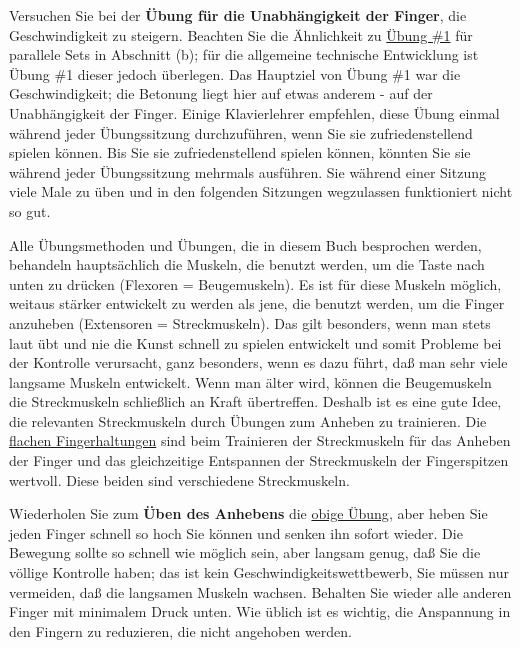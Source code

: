 Versuchen Sie bei der \textbf{Übung für die Unabhängigkeit der Finger}, die Geschwindigkeit zu steigern.
Beachten Sie die Ähnlichkeit zu \hyperref[c1iii7b1]{Übung \#1} für parallele Sets in Abschnitt (b); für die allgemeine technische Entwicklung ist Übung \#1 dieser jedoch überlegen.
Das Hauptziel von Übung \#1 war die Geschwindigkeit; die Betonung liegt hier auf etwas anderem - auf der Unabhängigkeit der Finger.
Einige Klavierlehrer empfehlen, diese Übung einmal während jeder Übungssitzung durchzuführen, wenn Sie sie zufriedenstellend spielen können.
Bis Sie sie zufriedenstellend spielen können, könnten Sie sie während jeder Übungssitzung mehrmals ausführen.
Sie während einer Sitzung viele Male zu üben und in den folgenden Sitzungen wegzulassen funktioniert nicht so gut.

Alle Übungsmethoden und Übungen, die in diesem Buch besprochen werden, behandeln hauptsächlich die Muskeln, die benutzt werden, um die Taste nach unten zu drücken (Flexoren = Beugemuskeln).
Es ist für diese Muskeln möglich, weitaus stärker entwickelt zu werden als jene, die benutzt werden, um die Finger anzuheben (Extensoren = Streckmuskeln).
Das gilt besonders, wenn man stets laut übt und nie die Kunst schnell zu spielen entwickelt und somit Probleme bei der Kontrolle verursacht, ganz besonders, wenn es dazu führt, daß man sehr viele langsame Muskeln entwickelt.
Wenn man älter wird, können die Beugemuskeln die Streckmuskeln schließlich an Kraft übertreffen.
Deshalb ist es eine gute Idee, die relevanten Streckmuskeln durch Übungen zum Anheben zu trainieren.
Die \hyperref[c1iii4b]{flachen Fingerhaltungen} sind beim Trainieren der Streckmuskeln für das Anheben der Finger und das gleichzeitige Entspannen der Streckmuskeln der Fingerspitzen wertvoll.
Diese beiden sind verschiedene Streckmuskeln.


\label{c1iii7anheben}

Wiederholen Sie zum \textbf{Üben des Anhebens} die \hyperref[c1iii7finger]{obige Übung}, aber heben Sie jeden Finger schnell so hoch Sie können und senken ihn sofort wieder.
Die Bewegung sollte so schnell wie möglich sein, aber langsam genug, daß Sie die völlige Kontrolle haben; das ist kein Geschwindigkeitswettbewerb, Sie müssen nur vermeiden, daß die langsamen Muskeln wachsen.
Behalten Sie wieder alle anderen Finger mit minimalem Druck unten.
Wie üblich ist es wichtig, die Anspannung in den Fingern zu reduzieren, die nicht angehoben werden.

